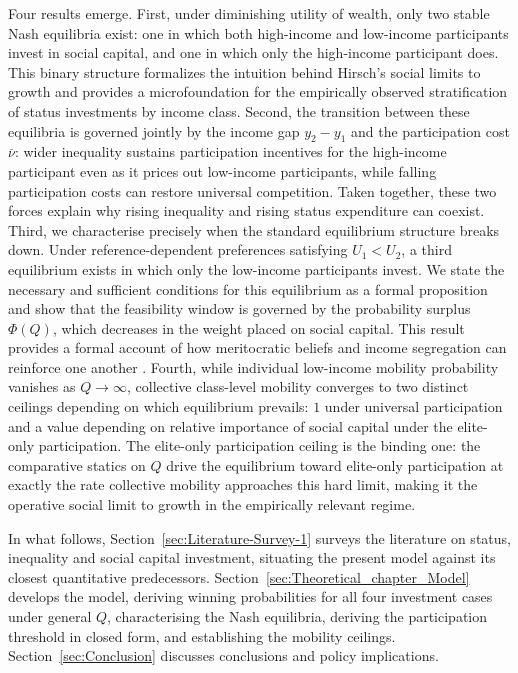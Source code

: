\documentclass[
    oneside,
    fontsize=10pt,leqno]{article}
\begin{document}
Four results emerge. First, under diminishing utility of wealth,
only two stable Nash equilibria exist: one in which both high-income and
low-income participants invest in social capital, and one in which only the high-income participant does.
This binary structure formalizes the intuition behind Hirsch's social limits to growth \citep{HirschSocialLimits} and provides
a microfoundation for the empirically observed stratification of status
investments by income class. Second, the transition between these
equilibria is governed jointly by the income gap $y_{2}-y_{1}$ and
the participation cost $\overline{\nu}$: wider inequality sustains
participation incentives for the high-income participant even as it prices out low-income participants,
while falling participation costs can restore universal competition.
Taken together, these two forces explain why rising inequality and
rising status expenditure can coexist. Third, we characterise precisely when the standard equilibrium
structure breaks down. Under reference-dependent preferences satisfying
$U_{1}<U_{2}$, a third equilibrium exists in which only the low-income participants invest. We state the necessary and sufficient conditions for this
equilibrium as a formal proposition and show that the feasibility
window is governed by the probability surplus $\Phi(Q)$, which
decreases in the weight placed on social capital. This result provides
a formal account of how meritocratic beliefs and income segregation
can reinforce one another
\citep{MijsMeritocracy2020,MijsParadox2019}. Fourth, while individual
low-income mobility probability vanishes as $Q\to\infty$, collective
class-level mobility converges to two distinct ceilings depending on
which equilibrium prevails: $1$ under universal participation and a value depending 
on relative importance of social capital under the elite-only participation. The elite-only participation ceiling is the binding one: the comparative statics on $Q$ drive the
equilibrium toward elite-only participation at exactly the rate
collective mobility approaches this hard limit, making it the
operative social limit to growth in the empirically relevant regime.

In what follows, Section~\ref{sec:Literature-Survey-1}
surveys the literature on status, inequality and social capital
investment, situating the present model against its closest quantitative
predecessors. Section~\ref{sec:Theoretical_chapter_Model} develops the
model, deriving winning probabilities for all four investment cases
under general $Q$, characterising the Nash equilibria, deriving the
participation threshold in closed form, and establishing the mobility
ceilings. Section~\ref{sec:Conclusion} discusses conclusions and policy implications.
\end{document}
